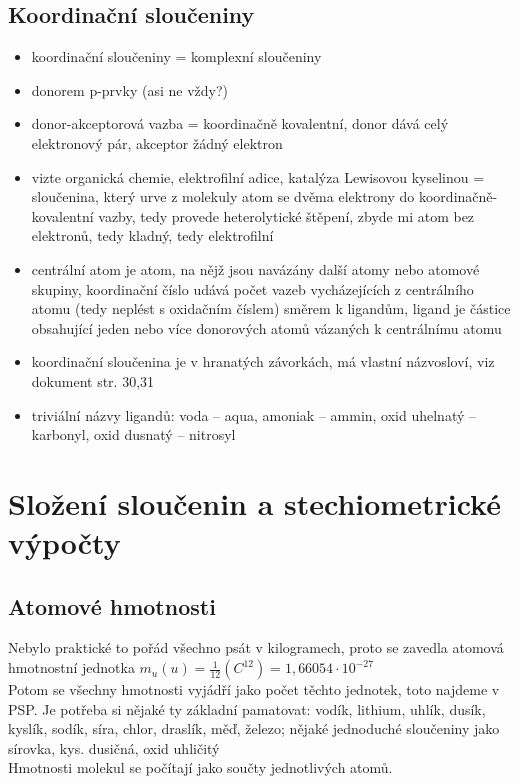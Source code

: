 \documentclass{article}
\begin{document}
\subsection{Koordinační sloučeniny}
\begin{itemize}
  \item koordinační sloučeniny = komplexní sloučeniny
  \item donorem p-prvky (asi ne vždy?)
  \item donor-akceptorová vazba = koordinačně kovalentní, donor dává celý elektronový pár, akceptor žádný elektron
  \item vizte organická chemie, elektrofilní adice, katalýza Lewisovou kyselinou = sloučenina, který urve z molekuly atom se dvěma elektrony do koordinačně-kovalentní vazby, tedy provede heterolytické štěpení, zbyde mi atom bez elektronů, tedy kladný, tedy elektrofilní
  \item centrální atom je atom, na nějž jsou navázány další atomy nebo atomové skupiny, koordinační číslo udává počet vazeb vycházejících z centrálního atomu (tedy neplést s oxidačním číslem) směrem k ligandům, ligand je částice obsahující jeden nebo více donorových atomů vázaných k centrálnímu atomu
  \item koordinační sloučenina je v hranatých závorkách, má vlastní názvosloví, viz dokument str. 30,31
  \item triviální názvy ligandů: voda -- aqua, amoniak -- ammin, oxid uhelnatý -- karbonyl, oxid dusnatý -- nitrosyl
\end{itemize}

\section{Složení sloučenin a stechiometrické výpočty}

\subsection{Atomové hmotnosti}
Nebylo praktické to pořád všechno psát v kilogramech, proto se zavedla atomová hmotnostní jednotka $m_u (u) = \frac{1}{12}(C^{12}) = 1,66054 \cdot 10^{-27}$\\
Potom se všechny hmotnosti vyjádří jako počet těchto jednotek, toto najdeme v PSP. Je potřeba si nějaké ty základní pamatovat: vodík, lithium, uhlík, dusík, kyslík, sodík, síra, chlor, draslík, měď, železo; nějaké jednoduché sloučeniny jako sírovka, kys. dusičná, oxid uhličitý\\
Hmotnosti molekul se počítají jako součty jednotlivých atomů.
\end{document}
